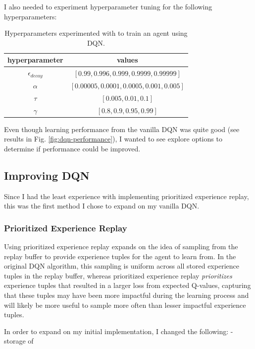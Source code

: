 \documentclass[11pt]{article}
\begin{document}
I also needed to experiment hyperparameter tuning for the following 
hyperparameters:

\FloatBarrier

\begin{table}[!ht]
	\centering
	\begin{tabular}{ c | c }
	\textbf{hyperparameter} & \textbf{values} \\
	\hline
	$\epsilon_{decay}$ & $[0.99, 0.996, 0.999, 0.9999, 0.99999]$ \\
	$\alpha$ & $[0.00005, 0.0001, 0.0005, 0.001, 0.005]$ \\
	$\tau$ & $[0.005, 0.01, 0.1]$ \\
	$\gamma$ & $[0.8, 0.9, 0.95, 0.99]$ \\
	\hline
	\end{tabular}
	\caption{Hyperparameters experimented with to train an agent using DQN.}
	\label{tbl:hyperparameters}
\end{table}

\FloatBarrier

Even though learning performance from the vanilla DQN was quite good (see results in
Fig. \ref{fig:dqn-performance}), I wanted to see explore options to determine if
performance could be improved.

\subsection{Improving DQN}

Since I had the least experience with implementing prioritized experience
replay, this was the first method I chose to expand on my vanilla DQN.

\subsubsection{Prioritized Experience Replay}

Using prioritized experience replay expands on the idea of sampling from the
replay buffer to provide experience tuples for the agent to learn from. In the
original DQN algorithm, this sampling is uniform across all stored experience
tuples in the replay buffer, whereas prioritized experience replay
\textit{prioritizes} experience tuples that resulted in a larger loss from
expected Q-values, capturing that these tuples may have been more impactful
during the learning process and will likely be more useful to sample more often
than lesser impactful experience tuples.

In order to expand on my initial implementation, I changed the following:
- storage of 
\end{document}
